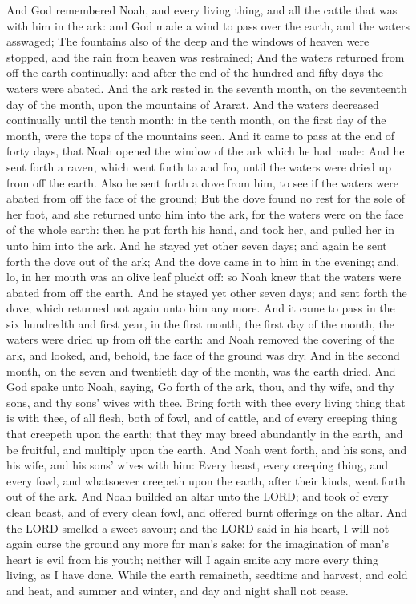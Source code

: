 \begin{biblechapter} %
\verse And God remembered Noah, and every living thing, and all the cattle that was with him in the ark: and God made a wind to pass over the earth, and the waters asswaged;
\verse The fountains also of the deep and the windows of heaven were stopped, and the rain from heaven was restrained;
\verse And the waters returned from off the earth continually: and after the end of the hundred and fifty days the waters were abated.
\verse And the ark rested in the seventh month, on the seventeenth day of the month, upon the mountains of Ararat.
\verse And the waters decreased continually until the tenth month: in the tenth month, on the first day of the month, were the tops of the mountains seen.
\verse And it came to pass at the end of forty days, that Noah opened the window of the ark which he had made:
\verse And he sent forth a raven, which went forth to and fro, until the waters were dried up from off the earth.
\verse Also he sent forth a dove from him, to see if the waters were abated from off the face of the ground;
\verse But the dove found no rest for the sole of her foot, and she returned unto him into the ark, for the waters were on the face of the whole earth: then he put forth his hand, and took her, and pulled her in unto him into the ark.
\verse And he stayed yet other seven days; and again he sent forth the dove out of the ark;
\verse And the dove came in to him in the evening; and, lo, in her mouth was an olive leaf pluckt off: so Noah knew that the waters were abated from off the earth.
\verse And he stayed yet other seven days; and sent forth the dove; which returned not again unto him any more.
\verse And it came to pass in the six hundredth and first year, in the first month, the first day of the month, the waters were dried up from off the earth: and Noah removed the covering of the ark, and looked, and, behold, the face of the ground was dry.
\verse And in the second month, on the seven and twentieth day of the month, was the earth dried.
\verse And God spake unto Noah, saying,
\verse Go forth of the ark, thou, and thy wife, and thy sons, and thy sons' wives with thee.
\verse Bring forth with thee every living thing that is with thee, of all flesh, both of fowl, and of cattle, and of every creeping thing that creepeth upon the earth; that they may breed abundantly in the earth, and be fruitful, and multiply upon the earth.
\verse And Noah went forth, and his sons, and his wife, and his sons' wives with him:
\verse Every beast, every creeping thing, and every fowl, and whatsoever creepeth upon the earth, after their kinds, went forth out of the ark.
\verse And Noah builded an altar unto the LORD; and took of every clean beast, and of every clean fowl, and offered burnt offerings on the altar.
\verse And the LORD smelled a sweet savour; and the LORD said in his heart, I will not again curse the ground any more for man's sake; for the imagination of man's heart is evil from his youth; neither will I again smite any more every thing living, as I have done.
\verse While the earth remaineth, seedtime and harvest, and cold and heat, and summer and winter, and day and night shall not cease.
\end{biblechapter}


